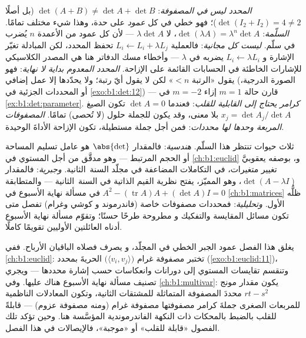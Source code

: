 \begin{remark}
\label{rem:b1:det:pitfalls}
\emph{المحدد ليس  في المصفوفة}: $\det(A + B)
\neq \det A + \det B$ (بل أصلًا $\det(I_2 + I_2) = 4 \neq 2$)؛ فهو
خطي في كل \emph{عمود} على حدة، وهذا شيء مختلف
تمامًا.
\emph{السلّمة}: $\det(\lambda A) = \lambda^n\det A$، لا
$\lambda\det A$ --- لأن كل عمود من الأعمدة $n$ يُضرب في سلّم.
\emph{ليست كل  مجانية}: فالعملية $L_i \leftarrow L_i +
\lambda L_j$ تحفظ المحدد، لكن المبادلة تغيّر
الإشارة و $L_i \leftarrow \lambda L_i$ يضربه في $\lambda$
--- وأخطاء مسك الدفاتر هنا هي المصدر الكلاسيكي للإشارات
الخاطئة في الحسابات القائمة على الإزاحة.
\emph{المحدد المعدوم بداية لا نهاية}: فهو يقول
«الرتبة $< n$» لكن لا يقول أيّ رتبة؛ ولا يحدّدها إلا عمل إضافي (الصورة
الدرجية، أو المحددات الجزئية في \cref{exo:b1:det:12}) --- قارن
حالة $m = 1$ إزاء $m = -2$ في \cref{ex:b1:det:parameter}.
\emph{كرامر يحتاج إلى القابلية للقلب}: فعندما $\det A = 0$ تكون
الصيغ $x_j = \det A_j/\det A$ بلا معنى، وقد يكون للجملة
حلول (لا تُحصى) تمامًا.
\emph{المصفوفات المربعة وحدها لها محددات}: فمن أجل جملة
مستطيلة، تكون الإزاحة الأداةَ الوحيدة.
\end{remark}

\begin{remark}
\label{rem:b1:det:whereused}
ثلاث حيوات تنتظر هذا السلّم. \emph{هندسية}: فالمقدار $\abs{\det}$ هو
عامل تسليم المساحة أو الحجم  المرتبط --- وهو
مدقَّق من أجل المستوي في \cref{ch:b1:euclid} و، بوصفه يعقوبيَّ
تغيير متغيرات، في التكاملات المضاعفة في مجلّد السنة~الثانية.
\emph{وجبرية}: فالمقدار $\det(A - \lambda I)$، وهو 
المميّز، يفتح نظرية القيم الذاتية في السنة~الثانية ---
والمتطابقة $A^2 - (\operatorname{tr} A)A + (\det A)I = 0$ في
مسألة نهاية الأسبوع في \cref{ch:b1:matrices} ظلُّه الأول.
\emph{وتحليلية}: فمحددات مصفوفات خاصة (فاندرموند و
كوشي وغرام) تفصل متى تكون مسائل المقايسة والتفكيك و
 مطروحة طرحًا حسنًا؛ وتقوّم مسألة نهاية الأسبوع أدناه
العائلتين الأوليين تقويمًا كاملًا.
\end{remark}

\begin{remark}
\label{rem:b1:det:perspectives}
يغلق هذا الفصل عمود الجبر الخطي في المجلّد، و
يصرف فصلاه الباقيان الأرباح. ففي
\cref{ch:b1:euclid}: تختبر مصفوفة غرام
$\bigl(\langle v_i, v_j\rangle\bigr)$ الحريةَ بمحدد
(\cref{exo:b1:euclid:11})، وتنقسم تقايسات المستوي
إلى دورانات وانعكاسات حسب إشارة
محددها --- ويجري تصنيف مسألة نهاية الأسبوع هناك عليها. وفي
\cref{ch:b1:multivar}: يكون مقدار مونج $rt -
s^2$ محددَ المصفوفة المتماثلة للمشتقات
الثانية، وتكون المعادلات الناظمية للمربعات الصغرى جملةَ
كرامر مصفوفتها مصفوفة غرام (ومنه مصفوفة عزوم) ---
قابلةً للقلب بالضبط بالمحكات ذات النكهة الفاندرموندية
المؤسَّسة هنا. وحين تؤكد تلك الفصول «قابلة للقلب» أو
«موجبة»، فالإيصالات في هذا الفصل.
\end{remark}

